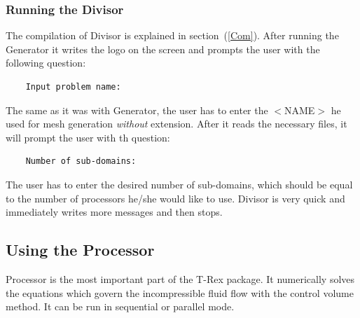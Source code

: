 \documentclass[10pt]{article}
\newcommand*{\tc}{\ttfamily} %
\newcommand*{\tn}{\sffamily} %
\begin{document}
    \subsubsection{Running the {\tn Divisor}}
    
    The compilation of {\tn Divisor} is explained in section~(\ref{Com}).
    After running the {\tn Generator} it writes the logo on the screen
    and prompts the user with the
    following question:
    \small
    \begin{verbatim}
    Input problem name:
    \end{verbatim}
    \normalsize
    The same as it was with {\tn Generator}, the user has to enter
    the {\tc $<$NAME$>$} he used for mesh generation {\em without}
    extension. After it reads the necessary files, it will prompt
    the user with th question:
    \small
    \begin{verbatim}
    Number of sub-domains:
    \end{verbatim}
    \normalsize
    The user has to enter the desired number of sub-domains, which
    should be equal to the number of processors he/she would like
    to use. {\tn Divisor} is very quick and immediately writes
    more messages and then stops.

%
    \subsection{Using the {\tn Processor}}
%

    {\tn Processor} is the most important part of the {\tn T-Rex}
    package. It numerically solves the equations which govern the
    incompressible fluid flow with the control volume method. It 
    can be run in sequential or parallel mode. 
\end{document}
